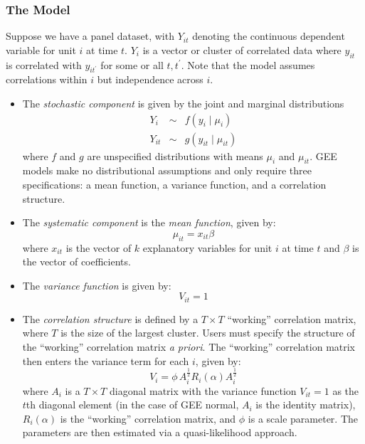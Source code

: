 \subsubsection{The Model}
Suppose we have a panel dataset, with $Y_{it}$ denoting the continuous dependent variable for unit $i$ at time $t$.  $Y_{i}$ is a vector or cluster of correlated data
where $y_{it}$ is correlated with $y_{it^\prime}$ for some or all
$t, t^\prime$.  Note that the model assumes correlations within $i$ but independence across $i$.  

\begin{itemize}

\item The \emph{stochastic component} is given by the joint and marginal distributions
\begin{eqnarray*}
Y_{i} &\sim& f(y_{i} \mid \mu_{i})\\
Y_{it} &\sim& g(y_{it} \mid \mu_{it})
\end{eqnarray*}
where $f$ and $g$ are unspecified distributions with means $\mu_{i}$ and $\mu_{it}$.  GEE models make no distributional assumptions and only require three specifications: a mean function, a variance function, and a correlation structure.

\item The \emph{systematic component} is the \textit{mean function}, given by:
\begin{equation*}
\mu_{it} = x_{it} \beta
\end{equation*}
where $x_{it}$ is the vector of $k$ explanatory variables for unit $i$ at time $t$
and $\beta$ is the vector of coefficients.

\item The \textit{variance function} is given by: 
\begin{equation*}
V_{it} = 1
\end{equation*} 

\item The \textit{correlation structure} is defined by a $T \times T$ ``working'' correlation matrix, where $T$ is the size of the largest cluster.  Users must specify the structure of the ``working'' correlation matrix \textit{a priori}.  The ``working'' correlation matrix then enters the variance term for each $i$, given by:
\begin{equation*}
V_{i} = \phi \, A_{i}^{\frac{1}{2}} R_{i}(\alpha) A_{i}^{\frac{1}{2}}
\end{equation*}
where $A_{i}$ is a $T \times T$ diagonal matrix with the variance function $V_{it} = 1$ as the $t$th diagonal element (in the case of GEE normal, $A_{i}$ is the identity matrix), $R_{i}(\alpha)$ is the ``working'' correlation matrix, and $\phi$ is a scale parameter.  The parameters are then estimated via a quasi-likelihood approach.


\end{itemize}
